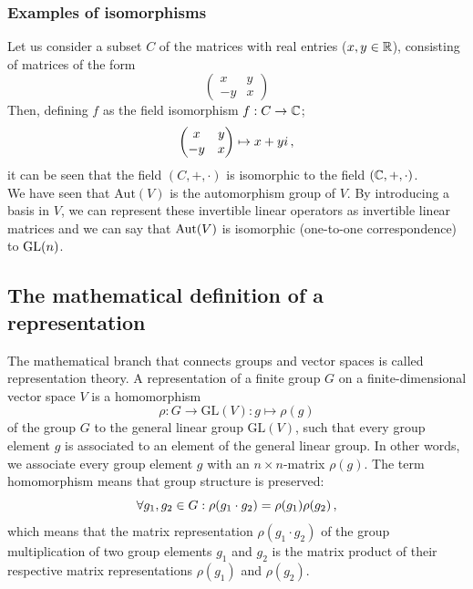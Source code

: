         \subsubsection{Examples of isomorphisms}
            Let us consider a subset $C$ of the matrices with real entries ($x, y \in \mathbb{R}$), consisting of matrices of the form
            \begin{equation}
                \begin{pmatrix} x & y \\ -y & x \end{pmatrix}
            \end{equation}
            Then, defining $f$ as the field isomorphism $f: C \rightarrow \mathbb{C}$;
            \begin{equation}
                \begin{pmatrix} x & y \\ -y & x \end{pmatrix} \mapsto x + yi \thinspace ,
            \end{equation}
            it can be seen that the field $(C, +, \cdot)$ is isomorphic to the field $(\mathbb{C}, +, \cdot)$. \\

            We have seen that $\text{Aut}(V)$ is the automorphism group of $V$. By introducing a basis in $V$, we can represent these invertible linear operators as invertible linear matrices and we can say that $\operatorname{Aut}(V)$ is isomorphic (one-to-one correspondence) to $\operatorname{GL}(n)$. \\

   \subsection{The mathematical definition of a representation}
        The mathematical branch that connects groups and vector spaces is called representation theory. A representation of a finite group $G$ on a finite-dimensional vector space $V$ is a homomorphism
        \begin{equation}
           \rho: G \rightarrow \text{GL}(V): g \mapsto \rho(g)
        \end{equation}
        of the group $G$ to the general linear group $\text{GL}(V)$, such that every group element $g$ is associated to an element of the general linear group. In other words, we associate every group element $g$ with an $n \times n$-matrix $\rho(g)$. The term homomorphism means that group structure is preserved:
        \begin{equation}
          \forall g_1, g_2 \in G: \rho(g_1 \cdot g_2) = \rho(g_1) \rho(g_2) \thinspace ,
        \end{equation}
        which means that the matrix representation $\rho(g_1 \cdot g_2)$ of the group multiplication of two group elements $g_1$ and $g_2$ is the matrix product of their respective matrix representations $\rho(g_1)$ and $\rho(g_2)$.

